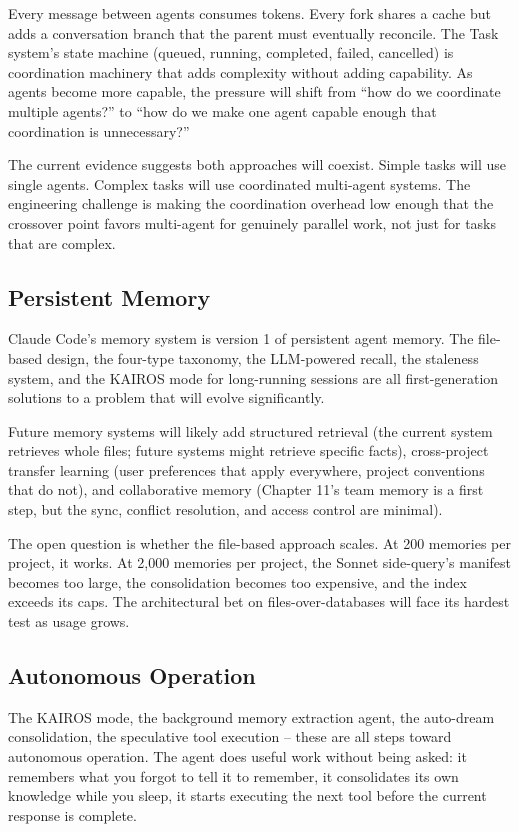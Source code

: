 \documentclass[
  english,
  11pt,
  letterpaper,
]{book}
\begin{document}
Every message between agents consumes tokens. Every fork shares a cache
but adds a conversation branch that the parent must eventually
reconcile. The Task system's state machine (queued, running, completed,
failed, cancelled) is coordination machinery that adds complexity
without adding capability. As agents become more capable, the pressure
will shift from ``how do we coordinate multiple agents?'' to ``how do we
make one agent capable enough that coordination is unnecessary?''

The current evidence suggests both approaches will coexist. Simple tasks
will use single agents. Complex tasks will use coordinated multi-agent
systems. The engineering challenge is making the coordination overhead
low enough that the crossover point favors multi-agent for genuinely
parallel work, not just for tasks that are complex.

\subsection{Persistent Memory}\label{persistent-memory}

Claude Code's memory system is version 1 of persistent agent memory. The
file-based design, the four-type taxonomy, the LLM-powered recall, the
staleness system, and the KAIROS mode for long-running sessions are all
first-generation solutions to a problem that will evolve significantly.

Future memory systems will likely add structured retrieval (the current
system retrieves whole files; future systems might retrieve specific
facts), cross-project transfer learning (user preferences that apply
everywhere, project conventions that do not), and collaborative memory
(Chapter 11's team memory is a first step, but the sync, conflict
resolution, and access control are minimal).

The open question is whether the file-based approach scales. At 200
memories per project, it works. At 2,000 memories per project, the
Sonnet side-query's manifest becomes too large, the consolidation
becomes too expensive, and the index exceeds its caps. The architectural
bet on files-over-databases will face its hardest test as usage grows.

\subsection{Autonomous Operation}\label{autonomous-operation}

The KAIROS mode, the background memory extraction agent, the auto-dream
consolidation, the speculative tool execution -- these are all steps
toward autonomous operation. The agent does useful work without being
asked: it remembers what you forgot to tell it to remember, it
consolidates its own knowledge while you sleep, it starts executing the
next tool before the current response is complete.
\end{document}
